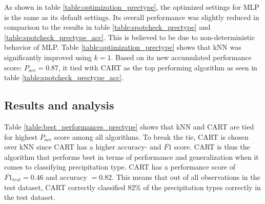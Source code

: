 	As shown in table \ref{table:optimization_prectype}, the optimized settings for MLP is the same as its default settings. Its overall performance was slightly reduced in comparison to the results in table \ref{table:spotcheck_prectype} and \ref{table:spotcheck_prectype_acc}. This is believed to be due to non-deterministic behavior of MLP. Table \ref{table:optimization_prectype} shows that kNN was significantly improved using $k=1$. Based on its new accumulated performance score: $P_{acc} = 0.87$, it tied with CART as the top performing algorithm as seen in table \ref{table:spotcheck_prectype_acc}.

	\subsection{Results and analysis} \label{sec:results_prectype}

	\begin{table}[H]
		\centering
		\caption{Shows the overall optimized settings and performances for each of the algorithms in classifiying precipitation type. The best performing algorithms are highlighted.}
	\end{table}

	Table \ref{table:best_performances_prectype} shows that kNN and CART are tied for highest $P_{acc}$ score among all algorithms. To break the tie, CART is chosen over kNN since CART has a higher accuracy- and $\overline{F1}$ score. CART is thus the algorithm that performs best in terms of performance and generalization when it comes to classifying precipitation type. CART has a performance score of $\overline{F1}_{test} = 0.46$ and accuracy $= 0.82$. This means that out of all observations in the test dataset, CART correctly classified 82\% of the precipitation types correctly in the test dataset. 

